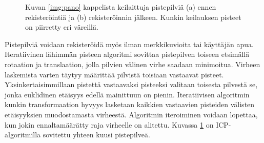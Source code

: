 \begin{figure}
    \centering
    
    \caption{Kuvan \ref{img:pano} kappelista keilaittuja pistepilviä (a) ennen rekisteröintiä ja (b) rekisteröinnin jälkeen. Kunkin keilauksen pisteet on piirretty eri väreillä.}
    \label{img:reg}
\end{figure}

Pistepilviä voidaan rekisteröidä myös ilman merkkikuvioita tai käyttäjän apua. Iteratiivinen lähimmän pisteen algoritmi  sovittaa pistepilven toiseen etsimällä rotaation ja translaation, jolla pilvien välinen virhe saadaan minimoitua. Virheen laskemista varten täytyy määrittää pilvistä toisiaan vastaavat pisteet. Yksinkertaisimmillaan pistettä vastaavaksi pisteeksi valitaan toisesta pilvestä se, jonka euklidinen etäisyys edellä mainittuun on pienin. Iteratiivisen algoritmin kunkin transformaation hyvyys lasketaan kaikkien vastaavien pisteiden välisten etäisyyksien muodostamasta virheestä. Algoritmin iteroiminen voidaan lopettaa, kun jokin ennaltamäärätty raja virheelle on alitettu. Kuvassa \ref{img:reg} on ICP-algoritmilla sovitettu yhteen kuusi pistepilveä. \cite{icp}

